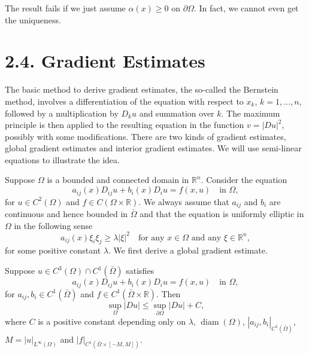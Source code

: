 \begin{remark}\label{hanlin:maxprin-remark-2-26}
The result fails if we just assume $\alpha(x)\ge 0$ on $\partial\Omega$. In fact, we cannot even get the uniqueness.
\end{remark}

\section*{2.4. Gradient Estimates}

The basic method to derive gradient estimates, the so-called the Bernstein method, involves a differentiation of the equation with respect to $x_k$, $k=1,\ldots,n$, followed by a multiplication by $D_k u$ and summation over $k$. The maximum principle is then applied to the resulting equation in the function $v=|Du|^2$, possibly with some modifications. There are two kinds of gradient estimates, global gradient estimates and interior gradient estimates. We will use semi-linear equations to illustrate the idea.

Suppose $\Omega$ is a bounded and connected domain in $\mathbb R^n$. Consider the equation
\[
a_{ij}(x)D_{ij}u+b_i(x)D_i u=f(x,u) \quad \text{in } \Omega,
\]
for $u\in C^2(\Omega)$ and $f\in C(\Omega\times\mathbb R)$. We always assume that $a_{ij}$ and $b_i$ are continuous and hence bounded in $\bar\Omega$ and that the equation is uniformly elliptic in $\Omega$ in the following sense
\[
a_{ij}(x)\xi_i\xi_j\ge \lambda|\xi|^2 \quad \text{for any } x\in \Omega \text{ and any } \xi\in \mathbb R^n,
\]
for some positive constant $\lambda$.
We first derive a global gradient estimate.

\begin{theorem}\label{hanlin:maxprin-theorem-2-27}
Suppose $u \in C^3(\Omega) \cap C^1(\bar{\Omega})$ satisfies
\begin{equation}
a_{ij}(x)D_{ij}u+b_i(x)D_i u=f(x,u) \quad \text{in } \Omega,
\tag{1}
\end{equation}
for $a_{ij}, b_i \in C^1(\bar{\Omega})$ and $f \in C^1(\bar{\Omega}\times \mathbb R)$. Then
\[
\sup_{\Omega} |Du| \leq \sup_{\partial \Omega} |Du| + C,
\]
where $C$ is a positive constant depending only on $\lambda$, $\operatorname{diam}(\Omega)$, $|a_{ij}, b_i|_{C^1(\bar{\Omega})}$, $M = |u|_{L^\infty(\Omega)}$ and $|f|_{C^1(\bar{\Omega}\times[-M,M])}$.
\end{theorem}

